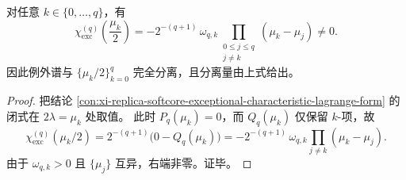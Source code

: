 \begin{conclusion}[张量谱节点处的显式避让值]\label{con:xi-replica-softcore-exceptional-node-avoidance-value}
对任意 \(k\in\{0,\dots,q\}\)，有
\[
\chi_{\mathrm{exc}}^{(q)}\!\left(\frac{\mu_k}{2}\right)
=-2^{-(q+1)}\,\omega_{q,k}\!\!\prod_{\substack{0\le j\le q\\ j\ne k}}\!(\mu_k-\mu_j)\neq 0.
\]
因此例外谱与 \(\{\mu_k/2\}_{k=0}^{q}\) 完全分离，且分离量由上式给出。
\end{conclusion}
\begin{proof}
把结论 \ref{con:xi-replica-softcore-exceptional-characteristic-lagrange-form} 的闭式在 \(2\lambda=\mu_k\) 处取值。
此时 \(P_q(\mu_k)=0\)，而 \(Q_q(\mu_k)\) 仅保留 \(k\)-项，故
\[
\chi_{\mathrm{exc}}^{(q)}(\mu_k/2)
=2^{-(q+1)}\bigl(0-Q_q(\mu_k)\bigr)
=-2^{-(q+1)}\,\omega_{q,k}\!\!\prod_{j\ne k}(\mu_k-\mu_j).
\]
由于 \(\omega_{q,k}>0\) 且 \(\{\mu_j\}\) 互异，右端非零。证毕。
\end{proof}






\endinput
